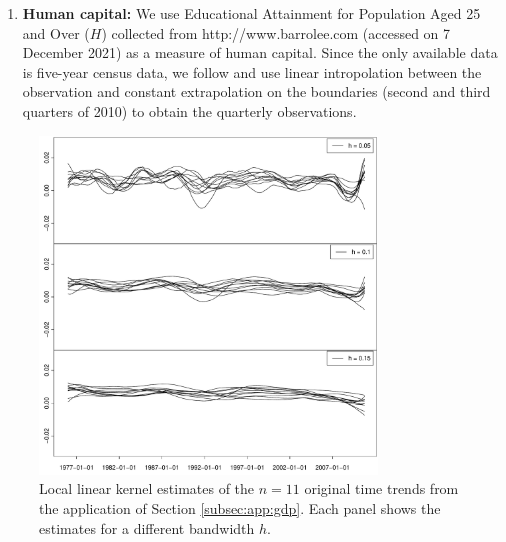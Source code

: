 \documentclass[a4paper,12pt]{article}
\begin{document}
{\begin{enumerate}
For all of the countries, the observations are given in thousands of persons.
\item \textbf{Human capital:} We use Educational Attainment for Population Aged 25 and Over ($H$) collected from http://www.barrolee.com (accessed on 7 December 2021) as a measure of human capital. Since the only available data is five-year census data, we follow \cite{Zhang2012} and use linear intropolation between the observation and constant extrapolation on the boundaries (second and third quarters of 2010) to obtain the quarterly observations.
\end{enumerate}


\begin{figure}[t]
\centering
\includegraphics[width=0.8\textwidth]{Plots/smoothed_gdp_data.pdf}
\vspace{0.2cm}
\caption{Local linear kernel estimates of the $n=11$ original time trends from the application of Section \ref{subsec:app:gdp}. Each panel shows the estimates for a different bandwidth $h$.}\label{plot:app:gdp}
\end{figure}

}
\end{document}
